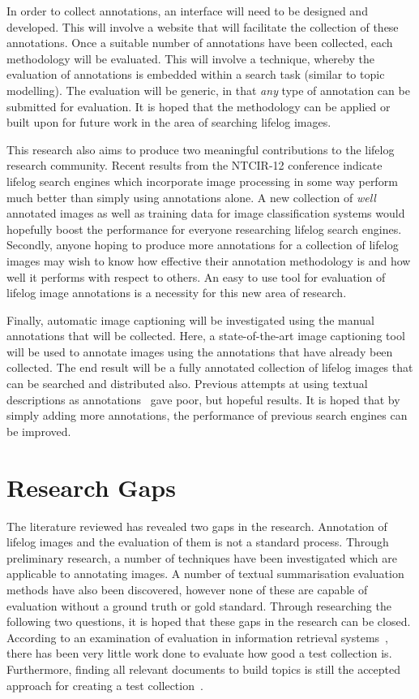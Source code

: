 In order to collect annotations, an interface will need to be designed and developed. This will involve a website that will facilitate the collection of these annotations. Once a suitable number of annotations have been collected, each methodology will be evaluated. This will involve a technique, whereby the evaluation of annotations is embedded within a search task (similar to topic modelling). The evaluation will be generic, in that \textit{any} type of annotation can be submitted for evaluation. It is hoped that the methodology can be applied or built upon for future work in the area of searching lifelog images.

This research also aims to produce two meaningful contributions to the lifelog research community. Recent results from the NTCIR-12 conference indicate lifelog search engines which incorporate image processing in some way perform much better than simply using annotations alone. A new collection of \textit{well} annotated images as well as training data for image classification systems would hopefully boost the performance for everyone researching lifelog search engines. Secondly, anyone hoping to produce more annotations for a collection of lifelog images may wish to know how effective their annotation methodology is and how well it performs with respect to others. An easy to use tool for evaluation of lifelog image annotations is a necessity for this new area of research.

Finally, automatic image captioning will be investigated using the manual annotations that will be collected. Here, a state-of-the-art image captioning tool will be used to annotate images using the annotations that have already been collected. The end result will be a fully annotated collection of lifelog images that can be searched and distributed also. Previous attempts at using textual descriptions as annotations~\cite{scells2016qut} gave poor, but hopeful results. It is hoped that by simply adding more annotations, the performance of previous search engines can be improved.

\section{Research Gaps}

The literature reviewed has revealed two gaps in the research. Annotation of lifelog images and the evaluation of them is not a standard process. Through preliminary research, a number of techniques have been investigated which are applicable to annotating images. A number of textual summarisation evaluation methods have also been discovered, however none of these are capable of evaluation without a ground truth or gold standard. Through researching the following two questions, it is hoped that these gaps in the research can be closed. According to an examination of evaluation in information retrieval systems~\cite[p. 24]{sanderson2010test}, there has been very little work done to evaluate how good a test collection is. Furthermore, finding all relevant documents to build topics is still the accepted approach for creating a test collection~\cite{cooper1973selecting}.

